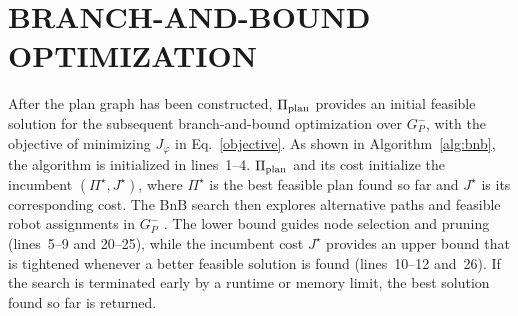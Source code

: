 \documentclass[lettersize,journal]{IEEEtran}
\theoremstyle{italiclemma}
\theoremstyle{italiclemma}
\theoremstyle{definition}
\begin{document}
\section{BRANCH-AND-BOUND OPTIMIZATION}
\label{sec:bnb_optimization}
After the plan graph has been constructed, $\Pi_{\rm plan}$ provides an initial feasible solution for the subsequent branch-and-bound optimization over $G_P^{-}$, with the objective of minimizing $J_\varphi$ in Eq.~\eqref{objective}. As shown in Algorithm~\ref{alg:bnb}, the algorithm is initialized in lines~1--4. $\Pi_{\rm plan}$ and its cost initialize the incumbent $(\Pi^\star,J^\star)$, where $\Pi^\star$ is the best feasible plan found so far and $J^\star$ is its corresponding cost. The BnB search then explores alternative paths and feasible robot assignments in $G_P^{-}$ . The lower bound guides node selection and pruning (lines~5--9 and 20--25), while the incumbent cost $J^\star$ provides an upper bound that is tightened whenever a better feasible solution is found (lines~10--12 and~26).
If the search is terminated early by a runtime or memory limit, the best solution found so far is returned.  
\end{document}
